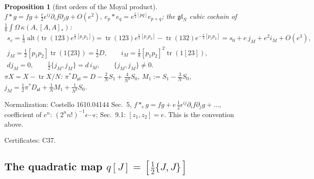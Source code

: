 \documentclass[10pt,a4paper]{article}
\numberwithin{equation}{section}
\newtheorem{proposition}[theorem]{Proposition}
\theoremstyle{definition}
\theoremstyle{remark}
\newcommand{\tr}{\operatorname{tr}}
\newcommand{\alt}{\operatorname{alt}}
\newcommand{\fsl}{\mathfrak{sl}}
\newcommand{\fgl}{\mathfrak{gl}}
\newcommand{\cert}[1]{\par\noindent\textup{Certificates: #1.}\par}
\begin{document}
\begin{proposition}[first orders of the Moyal product]\label{prop-moyal}
$f*g=fg+\frac e2\epsilon^{ij}\partial_if\partial_jg+O(e^2)$, $e_p*e_q=e^{\frac e2[pq]}e_{p+q}$; the $\fgl_N$ cubic cochain of $\frac16\int\Omega\,\kappa(A,[A,A]_*)$:
\begin{gather}
s_e=\tfrac13\alt\big(\tr(123)e^{\frac e2[p_1p_2]}\big)=\tr(123)e^{\frac e2[p_1p_2]}-\tr(132)e^{-\frac e2[p_1p_2]}=s_0+e\,j_M+e^2i_M+O(e^3),\\
j_M=\tfrac12[p_1p_2]\tr(1\{23\})=\tfrac12D,\qquad i_M=\tfrac18[p_1p_2]^2\tr(1[23]),\\
dj_M=0,\qquad \tfrac12\{j_M,j_M\}=d\,i_M,\qquad\{j_M,j_M\}\ne0 .
\end{gather}
$\pi X=X-\tr X/N$: $\pi^*D_{\fsl}=D-\frac2NS_1+\frac4{N^2}S_0$, $M_1:=S_1-\frac3NS_0$, $j_M=\frac12\pi^*D_{\fsl}+\frac1NM_1+\frac1{N^2}S_0$.
\end{proposition}
Normalization: Costello 1610.04144 \cite{C16} Sec.~5, $f*_eg=fg+e\,\frac12\epsilon^{ij}\partial_if\partial_jg+\dots$, coefficient of $e^n$: $(2^nn!)^{-1}\epsilon\cdots\epsilon$; Sec.~9.1: $[z_1,z_2]=e$. This is the convention above.
\cert{C37}

\subsection{\texorpdfstring{The quadratic map $q[J]=[\frac12\{J,J\}]$}{The quadratic map q}}
\end{document}
